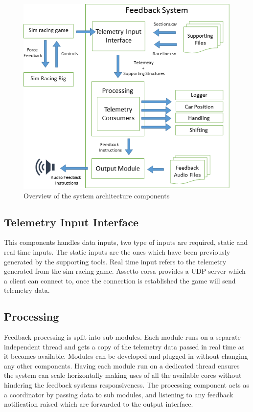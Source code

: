 \begin{figure}[!htb]
	\centering
	\includegraphics[height=10cm]{images/SystemArch}
	\caption{Overview of the system architecture components}
	\label{fig:SystemArch}
\end{figure}

\subsection{Telemetry Input Interface}
This components handles data inputs, two type of inputs are required, static and real time inputs. The static inputs are the ones which have been previously generated by the supporting tools. Real time input refers to the telemetry generated from the sim racing game. Assetto corsa provides a UDP server which a client can connect to, once the connection is established the game will send telemetry data.

\subsection{Processing}
Feedback processing is split into sub modules. Each module runs on a separate independent thread and gets a copy of the telemetry data passed in real time as it becomes available. Modules can be developed and plugged in without changing any other components. Having each module run on a dedicated thread ensures the system can scale horizontally making uses of all the available cores without hindering the feedback systems responsiveness. The processing component acts as a coordinator by passing data to sub modules, and listening to any feedback notification raised which are forwarded to the output interface.

